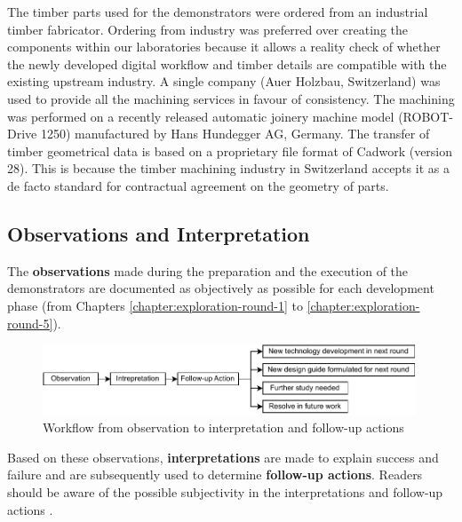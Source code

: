 The timber parts used for the demonstrators were ordered from an industrial timber fabricator. Ordering from industry was preferred over creating the components within our laboratories because it allows a reality check of whether the newly developed digital workflow and timber details are compatible with the existing upstream industry. A single company (Auer Holzbau, Switzerland) was used to provide all the machining services in favour of consistency. The machining was performed on a recently released automatic joinery machine model (ROBOT-Drive 1250) manufactured by Hans Hundegger AG, Germany. The transfer of timber geometrical data is based on a proprietary file format of Cadwork (version 28). This is because the timber machining industry in Switzerland accepts it as a de facto standard for contractual agreement on the geometry of parts.

\subsection{Observations and Interpretation}
\label{subsection:methodology-observations-and-interpretation}

The \textbf{observations }made during the preparation and the execution of the demonstrators are documented as objectively as possible for each development phase (from Chapters \ref{chapter:exploration-round-1} to \ref{chapter:exploration-round-5}). 


\begin{figure}[ht]
    \centering
    \includegraphics[width=0.99\textwidth]{images/03/Observation to followup actions.pdf}
    \caption{Workflow from observation to interpretation and follow-up actions}
    \label{fig:observation_andinterpretation_workflow}
\end{figure}


Based on these observations, \textbf{interpretations }are made to explain success and failure and are subsequently used to determine \textbf{follow-up actions}. Readers should be aware of the possible subjectivity in the interpretations and follow-up actions . 


